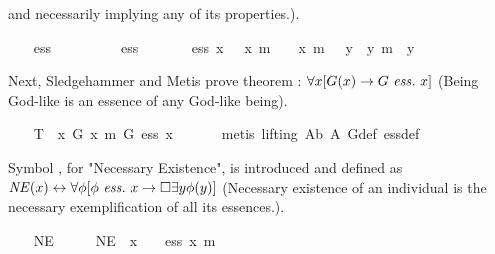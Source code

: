 \begin{isabellebody}
\begin{isamarkuptext}
and necessarily implying any of its properties.).%
\end{isamarkuptext}%
\isamarkuptrue%
\ \ \isamarkupfalse%
\ ess\ {\isacharcolon}{\isacharcolon}\ {\isachardoublequoteopen}{\isacharparenleft}{\isasymmu}\ {\isasymRightarrow}\ {\isasymsigma}{\isacharparenright}\ {\isasymRightarrow}\ {\isasymmu}\ {\isasymRightarrow}\ {\isasymsigma}{\isachardoublequoteclose}\ {\isacharparenleft}\ {\isachardoublequoteopen}ess{\isachardoublequoteclose}\ {}{}{\isacharparenright}\ \isanewline
\ \ \ \ {\isachardoublequoteopen}{\isasymPhi}\ ess\ x\ {\isacharequal}\ {\isasymPhi}\ x\ m{\isasymand}\ {\isasymPi}\ {\isacharparenleft}{\isasymlambda}{\isasympsi}{\isachardot}\ {\isasympsi}\ x\ m{\isasymRightarrow}\ {\isasymbox}\ {\isacharparenleft}{\isasymforall}\ {\isacharparenleft}{\isasymlambda}y{\isachardot}\ {\isasymPhi}\ y\ m{\isasymRightarrow}\ {\isasympsi}\ y{\isacharparenright}{\isacharparenright}{\isacharparenright}{\isachardoublequoteclose}%
\begin{isamarkuptext}%
Next, Sledgehammer and Metis prove theorem : $\forall x [G(x) \rightarrow G \ \mathit{ess.} \ x]$ 
(Being God-like is an essence of any God-like being).%
\end{isamarkuptext}%
\isamarkuptrue%
\ \ \isamarkupfalse%
\ T{}{\isacharcolon}\ {\isachardoublequoteopen}{\isacharbrackleft}{\isasymforall}\ {\isacharparenleft}{\isasymlambda}x{\isachardot}\ G\ x\ m{\isasymRightarrow}\ G\ ess\ x{\isacharparenright}{\isacharbrackright}{\isachardoublequoteclose}\isanewline
\ \ \isanewline
%
\isadelimproof
\ \ %
\endisadelimproof
%
\isatagproof
{}\isamarkupfalse%
\ {\isacharparenleft}metis\ {\isacharparenleft}lifting{\isacharparenright}\ A{}b\ A{}\ G{\isacharunderscore}def\ ess{\isacharunderscore}def{\isacharparenright}%
\endisatagproof
{\isafoldproof}%
%
\isadelimproof
%
\endisadelimproof
%
\begin{isamarkuptext}%
Symbol , for "Necessary Existence", is introduced and
defined as $\mathit{NE}(x) \leftrightarrow \forall \phi [\phi \ \mathit{ess.} \ x \rightarrow \Box \exists y \phi(y)]$ (Necessary 
existence of an individual is the necessary exemplification of all its essences.).%
\end{isamarkuptext}%
\isamarkuptrue%
\ \ \isamarkupfalse%
\ NE\ {\isacharcolon}{\isacharcolon}\ {\isachardoublequoteopen}{\isasymmu}\ {\isasymRightarrow}\ {\isasymsigma}{\isachardoublequoteclose}\ \ {\isachardoublequoteopen}NE\ {\isacharequal}\ {\isacharparenleft}{\isasymlambda}x{\isachardot}\ {\isasymPi}\ {\isacharparenleft}{\isasymlambda}{\isasymPhi}{\isachardot}\ {\isasymPhi}\ ess\ x\ m{\isasymRightarrow}\ {\isasymbox}\ {\isacharparenleft}{\isasymexists}\ {\isasymPhi}{\isacharparenright}{\isacharparenright}{\isacharparenright}{\isachardoublequoteclose}%

\end{isabellebody}
